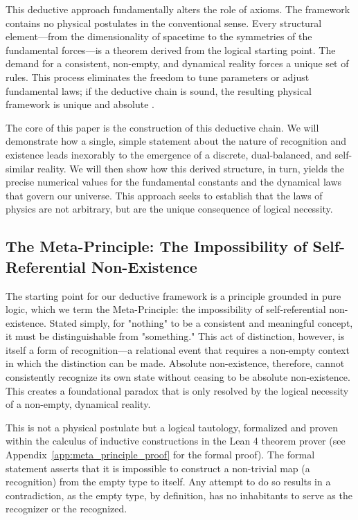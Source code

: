 This deductive approach fundamentally alters the role of axioms. The framework contains no physical postulates in the conventional sense. Every structural element—from the dimensionality of spacetime to the symmetries of the fundamental forces—is a theorem derived from the logical starting point. The demand for a consistent, non-empty, and dynamical reality forces a unique set of rules. This process eliminates the freedom to tune parameters or adjust fundamental laws; if the deductive chain is sound, the resulting physical framework is unique and absolute \cite{Tegmark2008, Baez2009}.

The core of this paper is the construction of this deductive chain. We will demonstrate how a single, simple statement about the nature of recognition and existence leads inexorably to the emergence of a discrete, dual-balanced, and self-similar reality. We will then show how this derived structure, in turn, yields the precise numerical values for the fundamental constants and the dynamical laws that govern our universe. This approach seeks to establish that the laws of physics are not arbitrary, but are the unique consequence of logical necessity.

\subsection{The Meta-Principle: The Impossibility of Self-Referential Non-Existence}
The starting point for our deductive framework is a principle grounded in pure logic, which we term the Meta-Principle: the impossibility of self-referential non-existence. Stated simply, for "nothing" to be a consistent and meaningful concept, it must be distinguishable from "something." This act of distinction, however, is itself a form of recognition—a relational event that requires a non-empty context in which the distinction can be made. Absolute non-existence, therefore, cannot consistently recognize its own state without ceasing to be absolute non-existence. This creates a foundational paradox that is only resolved by the logical necessity of a non-empty, dynamical reality.

This is not a physical postulate but a logical tautology, formalized and proven within the calculus of inductive constructions in the Lean 4 theorem prover (see Appendix~\ref{app:meta_principle_proof} for the formal proof). The formal statement asserts that it is impossible to construct a non-trivial map (a recognition) from the empty type to itself. Any attempt to do so results in a contradiction, as the empty type, by definition, has no inhabitants to serve as the recognizer or the recognized.


